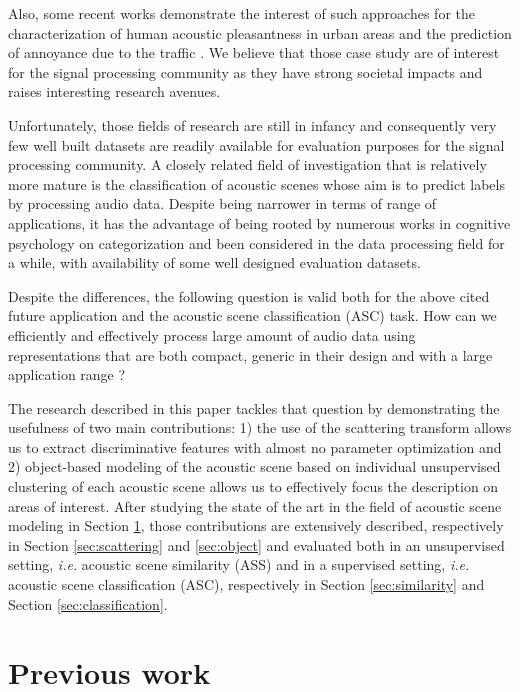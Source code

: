 \documentclass[journal]{IEEEtran}
\begin{document}
Also, some recent works demonstrate the interest of such approaches for the characterization of human acoustic pleasantness in urban areas \cite{lafayPartI, guyot2005urban, ricciardi2015sound} and the prediction of annoyance due to the traffic \cite{gloaguen}. We believe that those case study are of interest for the signal processing community as they have strong societal impacts and raises interesting research avenues. 

Unfortunately, those fields of research are still in infancy and consequently very few well built datasets are readily available for evaluation purposes for the signal processing community. A closely related field of investigation that is relatively more mature is the classification of acoustic scenes whose aim is to predict labels by processing audio data. Despite being narrower in terms of range of applications, it has the advantage of being rooted by numerous works in cognitive psychology on categorization \cite{dubois2006cognitive, maffiolo_caracterisation_1999, guastavino_ideal_2006} and been considered in the data processing field for a while, with availability of some well designed evaluation datasets. 

Despite the differences, the following question is valid both for the above cited future application and the acoustic scene classification (ASC) task. How can we efficiently and effectively process large amount of audio data using representations that are both compact, generic in their design and with a large application range ?  

The research described in this paper tackles that question by demonstrating the usefulness of two main contributions: 1) the use of the scattering transform allows us to extract discriminative features with almost no parameter optimization and 2) object-based modeling of the acoustic scene based on individual unsupervised clustering of each acoustic scene  allows us to effectively focus the description on areas of interest. After studying the state of the art in the field of acoustic scene modeling in Section \ref{sec:soa}, those contributions are extensively described, respectively in Section \ref{sec:scattering} and \ref{sec:object} and evaluated both in an unsupervised setting, \textit{i.e.} acoustic scene similarity (ASS) and in a supervised setting, \textit{i.e.}  acoustic scene classification (ASC), respectively in Section \ref{sec:similarity} and Section \ref{sec:classification}.

\section{Previous work} \label{sec:soa}
\end{document}
